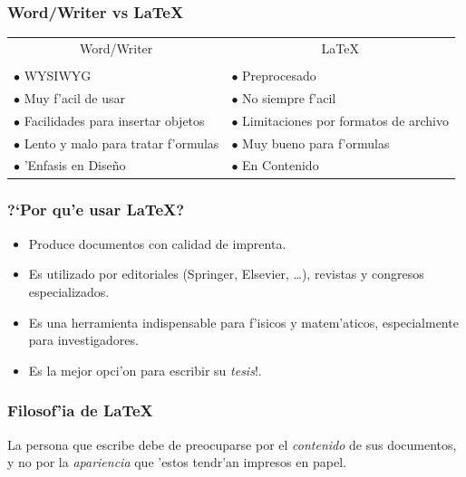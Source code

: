 \documentclass{beamer}
\begin{document}


\begin{frame}[fragile]\frametitle{Word/Writer vs \LaTeX}
\begin{center}
\begin{tabular}{p{}p{}}
\multicolumn{1}{c}{Word/Writer	}     & \multicolumn{1}{c}{\LaTeX}      \\
\\

$\bullet$ WYSIWYG            & $\bullet$ Preprocesado          \\
$\bullet$ Muy f'acil de usar & $\bullet$ No siempre f'acil     \\
$\bullet$ Facilidades para insertar objetos 
                             & $\bullet$ Limitaciones por formatos de archivo \\[1ex]
$\bullet$ Lento y malo para tratar f'ormulas
                             & $\bullet$ Muy bueno para f'ormulas \\
$\bullet$ 'Enfasis en Dise\~no & $\bullet$ En Contenido         
\end{tabular}
\end{center}
\end{frame}

\begin{frame}[fragile]\frametitle{?`Por qu'e usar \LaTeX?}
\begin{itemize}
\item Produce documentos con calidad de imprenta.
\item Es utilizado por editoriales (Springer, Elsevier, \dots), revistas y congresos especializados.
\item Es una herramienta indispensable para f'isicos y matem'aticos, especialmente para
investigadores.
\item Es la mejor opci'on para escribir su \emph{tesis}!.
\end{itemize}
\end{frame}


\begin{frame}[fragile]\frametitle{Filosof'ia de \LaTeX}

\bigskip

\bigskip
\begin{block}{}
La persona que escribe debe de preocuparse por el \textit{contenido} de sus documentos, y no por la \textit{apariencia} que 'estos tendr'an impresos en papel.
\end{block}
\end{frame}
\end{document}
